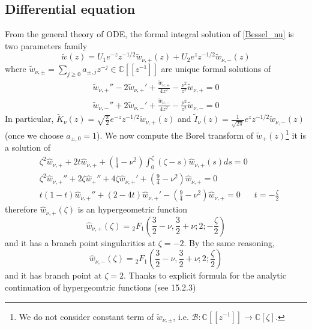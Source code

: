\documentclass{article}
\newcommand{\C}{\mathbb{C}}
\begin{document}
\subsection{Differential equation}
From the general theory of ODE, the formal integral solution of \eqref{Bessel_nu} is two parameters family 
\begin{equation}
\tilde{w}(z)=U_1e^{-z}z^{-1/2}\tilde{w}_{\nu,+}(z)+U_2e^{z}z^{-1/2}\tilde{w}_{\nu,-}(z)
\end{equation} 
where $\tilde{w}_{\nu,\pm}=\sum_{j\geq 0}a_{\pm,j}z^{-j}\in\C[\![z^{-1}]\!]$ are unique formal solutions of
\begin{align*}
\tilde{w}_{\nu,+}''-2\tilde{w}_{\nu,+}'+\frac{\tilde{w}_{\nu,+}}{4z^2}-\frac{\nu^2}{z^2}\tilde{w}_{\nu,+}=0\\
\tilde{w}_{\nu,-}''+2\tilde{w}_{\nu,-}'+\frac{\tilde{w}_{\nu,-}}{4z^2}-\frac{\nu^2}{z^2}\tilde{w}_{\nu,-}=0
\end{align*} 
In particular, $\tilde{K}_{\nu}(z)=\sqrt{\frac{\pi}{2}}e^{-z}z^{-1/2}\tilde{w}_{\nu,+}(z)$ and $\tilde{I}_\nu(z)=\frac{1}{\sqrt{2\pi}}e^zz^{-1/2}\tilde{w}_{\nu,-}(z)$ (once we choose $a_{\pm,0}=1$). We now compute the Borel transform of $\tilde{w}_+(z)$\footnote{We do not consider constant term of $\tilde{w}_{\nu,\pm}$, i.e. $\mathcal{B}:\C[\![z^{-1}]\!]\to \C[\zeta]$.} it is a solution of 
\begin{align*}
&\zeta^2\hat{w}_{\nu,+}+2t\hat{w}_{\nu,+}+\left(\frac{1}{4}-\nu^2\right)\int_0^{\zeta}(\zeta-s)\hat{w}_{\nu,+}(s)ds=0 &\\
&\zeta^2\hat{w}_{\nu,+}''+2\zeta\hat{w}_+''+4\zeta\hat{w}_{\nu,+}'+\left(\frac{9}{4}-\nu^2\right)\hat{w}_{\nu,+}=0 & \\
&t(1-t)\hat{w}_{\nu,+}''+(2-4t)\hat{w}_{\nu,+}'-\left(\frac{9}{4}-\nu^2\right)\hat{w}_{\nu,+}=0 & t=-\frac{\zeta}{2}
\end{align*} 
therefore $\hat{w}_{\nu,+}(\zeta)$ is an hypergeometric function
\begin{equation}
\hat{w}_{\nu,+}(\zeta)={}_2F_1\left(\frac{3}{2}-\nu,\frac{3}{2}+\nu;2;-\frac{\zeta}{2}\right)
\end{equation}
and it has a branch point singularities at $\zeta=-2$. By the same reasoning, 
\begin{equation}
\hat{w}_{\nu,-}(\zeta)={}_2F_1\left(\frac{3}{2}-\nu,\frac{3}{2}+\nu;2;\frac{\zeta}{2}\right)
\end{equation} 
and it has branch point at $\zeta=2$. Thanks to explicit formula for the analytic continuation of hypergeomtric functions (see \cite{dlmf} 15.2.3)
\end{document}
